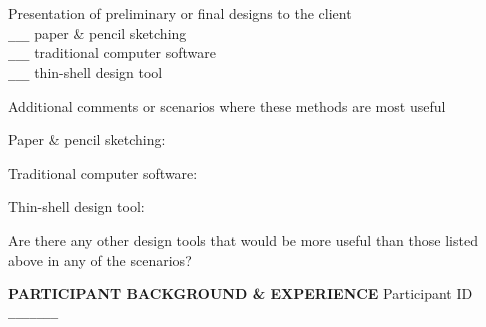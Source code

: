 \documentclass[12pt]{article}
\begin{document}
Presentation of preliminary or final designs to the client\\
\verb+___+ paper \& pencil sketching \\
\verb+___+ traditional computer software \\
\verb+___+ thin-shell design tool \\


\vspace{0.1in}

Additional comments or scenarios where these methods are most useful
\vspace{0.15in}

\hspace*{0.3in} 
Paper \& pencil sketching:
\vspace{1in}

\hspace*{0.3in} 
Traditional computer software:
\vspace{1in}

\hspace*{0.3in} 
Thin-shell design tool:
\vspace{1in}

Are there any other design tools that would be more useful than those listed above
in any of the scenarios?


\newpage
{\bf PARTICIPANT BACKGROUND \& EXPERIENCE}
\hfill Participant ID \verb+_______+
\vspace{0.3in}

\renewcommand\arraystretch{2}
\end{document}
